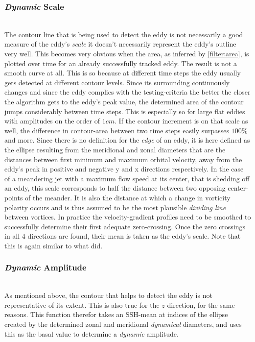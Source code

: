 \subsubsection{\textit{Dynamic} Scale} \label{filter:dynscale}
\\
The contour line that is being used to detect the eddy is not
necessarily a good measure of the eddy's \textit{scale} \ie it doesn't
necessarily represent the eddy's outline very well. This becomes very 
obvious when the area, as inferred by \ref{filter:area}, is plotted over time
for an already successfully tracked eddy. The result is not a smooth curve at
all. This is so because at different time steps the eddy usually gets detected
at different contour levels. Since its surrounding continuously changes and
since the eddy complies with the testing-criteria the better the closer the
algorithm gets to the eddy's peak value, the determined area of the contour
jumps considerably between time steps. This is especially so for large flat
eddies with amplitudes on the order of $1cm$. If the contour increment is on
that scale as well, the difference in contour-area between two time steps 
easily surpasses $100\%$ and more. 
Since there is no definition for the \textit{edge} of an eddy, it is here
defined as the ellipse resulting from the meridional and zonal diameters that
are the distances between first minimum and maximum orbital velocity, away from
the eddy's peak in positive and negative y and x directions respectively. 
In the case of a meandering jet with a maximum flow speed at its center, that
is shedding off an eddy, this scale corresponds to half the distance between
two opposing center-points of the meander. It is also the distance at which a
change in vorticity polarity occurs and is thus assumed to be the most plausible
\textit{dividing line} between vortices. 
In practice the velocity-gradient profiles need to be smoothed to successfully
determine their first adequate zero-crossing. Once the zero crossings in all
4 directions are found, their mean is taken as the eddy's scale. Note that this
is again similar to what \cite{Chelton2011} did. 
\subsubsection{\textit{Dynamic} Amplitude}
\\
As mentioned above, the contour that helps to detect the eddy is not
representative of its extent. This is also true for the $z$-direction, for the
same reasons. This function therefor takes an SSH-mean at indices of the ellipse
created by the determined zonal and meridional \textit{dynamical} diameters,
and uses this as the basal value to determine a \textit{dynamic} amplitude.
